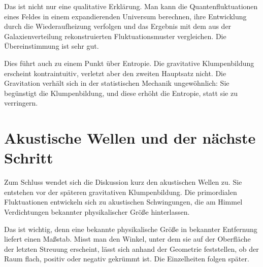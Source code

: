 Das ist nicht nur eine qualitative Erklärung. Man kann die Quantenfluktuationen eines Feldes in einem expandierenden Universum berechnen, ihre Entwicklung durch die Wiederaufheizung verfolgen und das Ergebnis mit dem aus der Galaxienverteilung rekonstruierten Fluktuationsmuster vergleichen. Die Übereinstimmung ist sehr gut.

Dies führt auch zu einem Punkt über Entropie. Die gravitative Klumpenbildung erscheint kontraintuitiv, verletzt aber den zweiten Hauptsatz nicht. Die Gravitation verhält sich in der statistischen Mechanik ungewöhnlich: Sie begünstigt die Klumpenbildung, und diese erhöht die Entropie, statt sie zu verringern.

\begin{classroomqa}
\end{classroomqa}

\section{Akustische Wellen und der nächste Schritt}

Zum Schluss wendet sich die Diskussion kurz den akustischen Wellen zu. Sie entstehen vor der späteren gravitativen Klumpenbildung. Die primordialen Fluktuationen entwickeln sich zu akustischen Schwingungen, die am Himmel Verdichtungen bekannter physikalischer Größe hinterlassen.

Das ist wichtig, denn eine bekannte physikalische Größe in bekannter Entfernung liefert einen Maßstab. Misst man den Winkel, unter dem sie auf der Oberfläche der letzten Streuung erscheint, lässt sich anhand der Geometrie feststellen, ob der Raum flach, positiv oder negativ gekrümmt ist. Die Einzelheiten folgen später.

\begin{classroomqa}
\end{classroomqa}